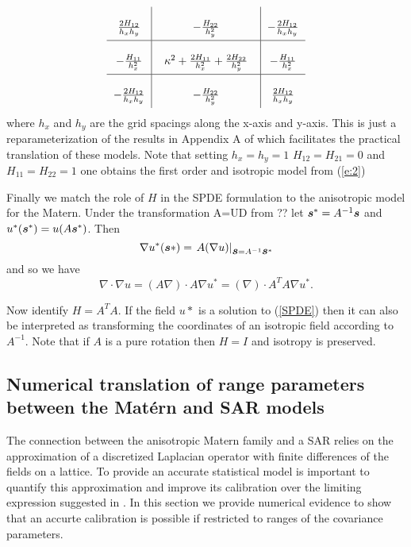 \documentclass[review]{elsarticle}
\begin{document}
\begin{equation}
\label{e:3}
       \arraycolsep=6.0pt\def\arraystretch{2.5}
   \begin{array}{c|c|c}
      \frac{2H_{12}}{h_x h_y} & -\frac{H_{22}}{h_y^2} & -\frac{2H_{12}}{h_x h_y} \\
        \hline
      -\frac{H_{11}}{h_x^2} & \;\; \kappa^2 + \frac{2H_{11}}{h_x^2} + \frac{2H_{22}}{h_y^2} \;\; & -\frac{H_{11}}{h_x^2} \\
      \hline
      -\frac{2H_{12}}{h_x h_y} & -\frac{H_{22}}{h_y^2} & \frac{2H_{12}}{h_x h_y} \\
    \end{array} 
\end{equation}
where $h_x$ and $h_y$ are the grid spacings along the x-axis and y-axis. This is just a reparameterization of the results in Appendix A of \cite{lindgren2011explicit} which facilitates the practical translation of these models. Note that setting $h_x = h_y =1$  $H_{12} = H_{21} =0$ and $H_{11} = H_{22} = 1$ one obtains the first order and isotropic model from (\ref{e:2})

Finally we match the role of $H$ in the SPDE formulation to the anisotropic model for the Matern.   Under the transformation A=UD from ?? let $\mbox{\boldmath $s$}^* =  A ^{-1}\mbox{\boldmath $s$} $ and $u^*(\mbox{\boldmath $s$}^*) = u( A\mbox{\boldmath $s$}^*)$.
 Then 
\[ \nabla u^*( \mbox{\boldmath $s$}*) =    \left. A (\nabla u) \right| _{\mbox{\boldmath $s$}= A^{-1} \mbox{\boldmath $s$}^*}  \]
 and so we have  
 \[ \nabla \cdot \nabla u  =  (A \nabla) \cdot A \nabla u^*  =  (\nabla) \cdot A^T A \nabla u^* . \] 

 
Now identify $H= A^TA$.  If the  field $u*$ is a solution to (\ref{SPDE})  then it can also be interpreted as transforming the coordinates of an isotropic field according to $A^{-1}$. Note that if $A$ is a pure rotation then $H=I$ and isotropy is preserved.  

\subsection{Numerical translation of range parameters between the Mat\'ern and SAR models}
\label{ss:1}

The connection between the anisotropic Matern family and a SAR relies on the approximation of a discretized Laplacian operator with finite differences of the fields on a lattice.  To provide an accurate statistical model is important to quantify this approximation and improve its calibration over the limiting expression suggested in \cite{lindgren2011explicit}. In this section we provide numerical evidence to show that an accurte calibration is possible if restricted to ranges of the covariance parameters. 
\end{document}
